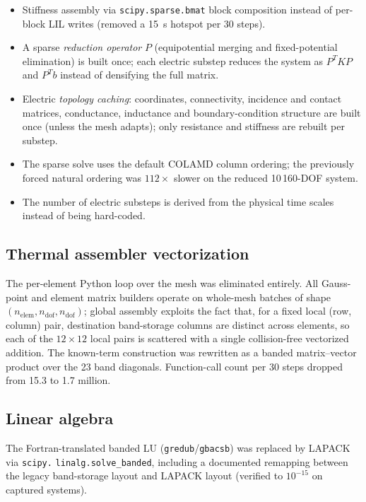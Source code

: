 \documentclass[11pt,a4paper]{article}
\newcommand{\code}[1]{\texttt{#1}}
\begin{document}
\begin{itemize}
  \item Stiffness assembly via \code{scipy.sparse.bmat} block composition instead of
        per-block LIL writes (removed a \SI{15}{s} hotspot per 30 steps).
  \item A sparse \emph{reduction operator} $P$ (equipotential merging and
        fixed-potential elimination) is built once; each electric substep reduces the
        system as $P^{T}KP$ and $P^{T}b$ instead of densifying the full matrix.
  \item Electric \emph{topology caching}: coordinates, connectivity, incidence and
        contact matrices, conductance, inductance and boundary-condition structure are
        built once (unless the mesh adapts); only resistance and stiffness are rebuilt
        per substep.
  \item The sparse solve uses the default COLAMD column ordering; the previously
        forced natural ordering was $112\times$ slower on the reduced
        10\,160-DOF system.
  \item The number of electric substeps is derived from the physical time scales
        instead of being hard-coded.
\end{itemize}

\subsection{Thermal assembler vectorization}

The per-element Python loop over the mesh was eliminated entirely. All Gauss-point and
element matrix builders operate on whole-mesh batches of shape
$(n_\mathrm{elem}, n_\mathrm{dof}, n_\mathrm{dof})$; global assembly exploits the fact
that, for a fixed local (row, column) pair, destination band-storage columns are
distinct across elements, so each of the $12\times12$ local pairs is scattered with a
single collision-free vectorized addition. The known-term construction was rewritten as
a banded matrix--vector product over the 23 band diagonals. Function-call count per
30 steps dropped from 15.3 to 1.7 million.

\subsection{Linear algebra}

The Fortran-translated banded LU (\code{gredub}/\code{gbacsb}) was replaced by
LAPACK via \code{scipy.} \code{linalg.solve\_banded}, including a documented remapping between
the legacy band-storage layout and LAPACK layout (verified to $10^{-15}$ on captured
systems).
\end{document}
